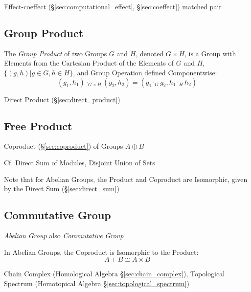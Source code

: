 Effect-coeffect (\S\ref{sec:computational_effect},
\S\ref{sec:coeffect}) matched pair



\subsection{Group Product}\label{sec:group_product}

The \emph{Group Product} of two Groups $G$ and $H$, denoted $G \times
H$, is a Group with Elements from the Cartesian Product of the
Elements of $G$ and $H$, $\{(g,h) | g \in G, h \in H\}$, and Group
Operation defined Componentwise:
\[
    (g_1, h_1) \cdot_{G \times H} (g_2, h_2)
    = (g_1 \cdot_G g_2, h_1 \cdot_H h_2)
\]

Direct Product (\S\ref{sec:direct_product})



\subsection{Free Product}\label{sec:free_product}

Coproduct (\S\ref{sec:coproduct}) of Groups $A \oplus B$

\fist Cf. Direct Sum of Modules, Disjoint Union of Sets

\fist Note that for Abelian Groups, the Product and Coproduct
are Isomorphic, given by the Direct Sum (\S\ref{sec:direct_sum})



\subsection{Commutative Group}\label{sec:commutative_group}

\emph{Abelian Group} also \emph{Commutative Group}

In Abelian Groups, the Coproduct is Isomorphic to the Product:
\[
  A + B \cong A \times B
\]

\fist Chain Complex (Homological Algebra \S\ref{sec:chain_complex}), Topological
Spectrum (Homotopical Algebra \S\ref{sec:topological_spectrum})

